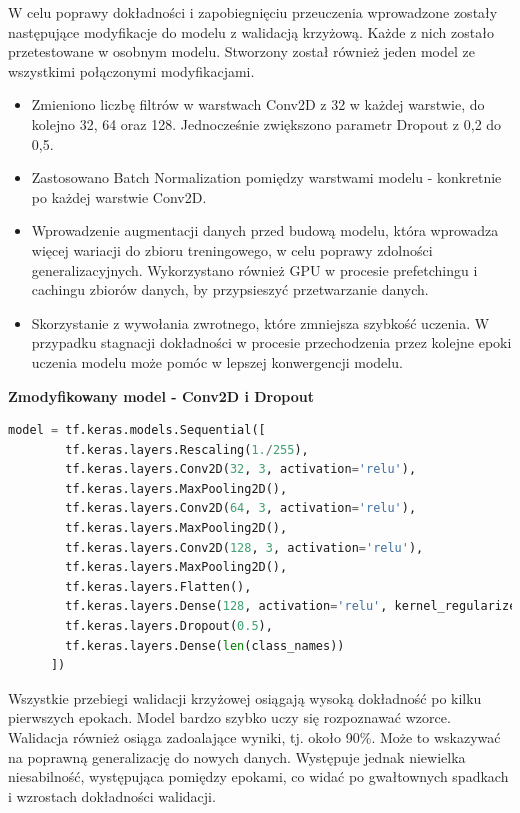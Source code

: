 W celu poprawy dokładności i zapobiegnięciu przeuczenia wprowadzone
zostały następujące modyfikacje do modelu z walidacją krzyżową.
Każde z nich zostało przetestowane w osobnym modelu.
Stworzony został również jeden model ze wszystkimi połączonymi modyfikacjami. 
\begin{itemize}[label=-,labelsep=0.4cm,leftmargin=0.6cm]
    \item Zmieniono liczbę filtrów w warstwach Conv2D z 32 w każdej warstwie, do kolejno 32, 64 oraz 128.
		Jednocześnie zwiększono parametr Dropout z 0,2 do 0,5.
    \item Zastosowano Batch Normalization pomiędzy warstwami modelu - konkretnie po każdej warstwie Conv2D.
    \item Wprowadzenie augmentacji danych przed budową modelu, która wprowadza więcej wariacji do zbioru treningowego,
		w celu poprawy zdolności generalizacyjnych.
		Wykorzystano również GPU w procesie prefetchingu i cachingu zbiorów danych, by przypsieszyć przetwarzanie danych.
	\item Skorzystanie z wywołania zwrotnego, które zmniejsza szybkość uczenia.
		W przypadku stagnacji dokładności w procesie przechodzenia przez kolejne epoki uczenia modelu
		może pomóc w lepszej konwergencji modelu.
\end{itemize}

\textbf{Zmodyfikowany model - Conv2D i Dropout}

\begin{lstlisting}[language=Python,caption=Listing zmodyfikowanego skryptu tworzącego model z walidacją krzyżową - wersja 1,
	label={tests-model-crossval1}]
	model = tf.keras.models.Sequential([
		tf.keras.layers.Rescaling(1./255),
		tf.keras.layers.Conv2D(32, 3, activation='relu'),
		tf.keras.layers.MaxPooling2D(),
		tf.keras.layers.Conv2D(64, 3, activation='relu'),
		tf.keras.layers.MaxPooling2D(),
		tf.keras.layers.Conv2D(128, 3, activation='relu'),
		tf.keras.layers.MaxPooling2D(),
		tf.keras.layers.Flatten(),
		tf.keras.layers.Dense(128, activation='relu', kernel_regularizer=tf.keras.regularizers.l2(0.01)),
		tf.keras.layers.Dropout(0.5),
		tf.keras.layers.Dense(len(class_names))
	  ])
\end{lstlisting}

Wszystkie przebiegi walidacji krzyżowej osiągają wysoką dokładność po kilku pierwszych epokach.
Model bardzo szybko uczy się rozpoznawać wzorce.
Walidacja również osiąga zadoalające wyniki, tj. około 90\%. Może to wskazywać na poprawną generalizację do nowych danych.
Występuje jednak niewielka niesabilność, występująca pomiędzy epokami,
co widać po gwałtownych spadkach i wzrostach dokładności walidacji.

